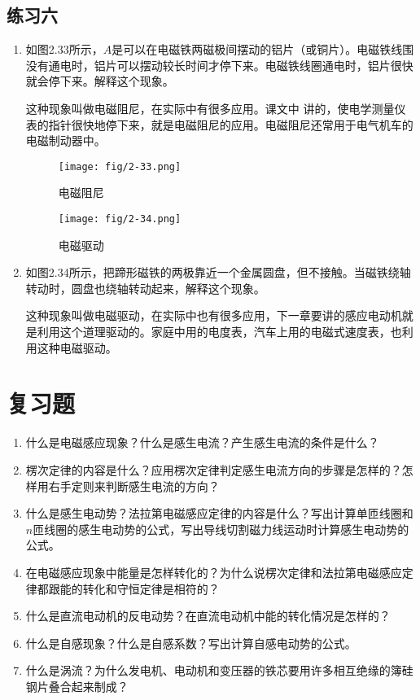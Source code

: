 \subsection*{练习六}
\begin{enumerate}
    \item 如图2.33所示，$A$是可以在电磁铁两磁极间摆动的铝片（或铜片）。电磁铁线围没有通电时，铝片可以摆动较长时间才停下来。电磁铁线圈通电时，铝片很快就会停下来。解释这个现象。
    
这种现象叫做电磁阻尼，在实际中有很多应用。课文中
讲的，使电学测量仪表的指针很快地停下来，就是电磁阻尼的应用。电磁阻尼还常用于电气机车的电磁制动器中。
\begin{figure}[htp]
\centering
\begin{minipage}[t]{0.48\textwidth}
\centering
\texttt{[image: fig/2-33.png]}
\caption{电磁阻尼}
\end{minipage}
\begin{minipage}[t]{0.48\textwidth}
\centering
\texttt{[image: fig/2-34.png]}
\caption{电磁驱动}
\end{minipage}
\end{figure}
\item 如图2.34所示，把蹄形磁铁的两极靠近一个金属圆盘，但不接触。当磁铁绕轴转动时，圆盘也绕轴转动起来，解释这个现象。

这种现象叫做电磁驱动，在实际中也有很多应用，下一章要讲的感应电动机就是利用这个道理驱动的。家庭中用的电度表，汽车上用的电磁式速度表，也利用这种电磁驱动。
\end{enumerate}

\section*{复习题}
\begin{enumerate}
    \item 什么是电磁感应现象？什么是感生电流？产生感生电流的条件是什么？
    \item 楞次定律的内容是什么？应用楞次定律判定感生电流方向的步骤是怎样的？怎样用右手定则来判断感生电流的方向？
    \item 什么是感生电动势？法拉第电磁感应定律的内容是什么？写出计算单匝线圈和$n$匝线圈的感生电动势的公式，写出导线切割磁力线运动时计算感生电动势的公式。
    \item 在电磁感应现象中能量是怎样转化的？为什么说楞次定律和法拉第电磁感应定律都跟能的转化和守恒定律是相符的？
    \item 什么是直流电动机的反电动势？在直流电动机中能的转化情况是怎样的？
    \item 什么是自感现象？什么是自感系数？写出计算自感电动势的公式。
    \item 什么是涡流？为什么发电机、电动机和变压器的铁芯要用许多相互绝缘的簿硅钢片叠合起来制成？
\end{enumerate}

